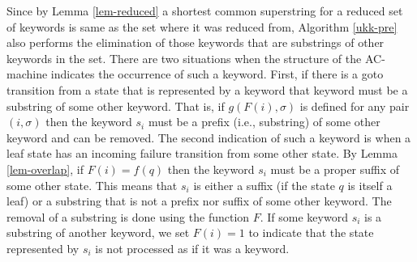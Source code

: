\documentclass[english,twoside,censored,csm,algorithms-track-2020]{HYthesisML}
\theoremstyle{plain}
\theoremstyle{definition}
\numberwithin{testexample}{chapter}
\begin{document}
Since by Lemma \ref{lem-reduced} a shortest common superstring for a reduced set of keywords
is same as the set where it was reduced from, Algorithm \ref{ukk-pre} also performs
the elimination of those keywords that are substrings of other keywords in the set. There are two
situations when the structure of the AC-machine indicates the occurrence of such a keyword. First,
if there is a goto transition from a state that is represented by a keyword that keyword
must be a substring of some other keyword. That is, if $g(F(i),\sigma)$ is defined for any pair
$(i,\sigma)$ then the keyword $s_i$ must be a prefix (i.e., substring) of some other keyword and can be
removed. The second indication of such a keyword is when a leaf state has an incoming failure
transition from some other state. By Lemma \ref{lem-overlap}, if $F(i) = f(q)$ then the keyword
$s_i$ must be a proper suffix of some other state. This means that $s_i$ is either a suffix
(if the state $q$ is itself a leaf) or a substring that is not a prefix nor suffix of some other
keyword. The removal of a substring is done using the function $F$. If some keyword
$s_i$ is a substring of another keyword, we set $F(i)=1$ to indicate that the state represented
by $s_i$ is not processed as if it was a keyword.
\end{document}
